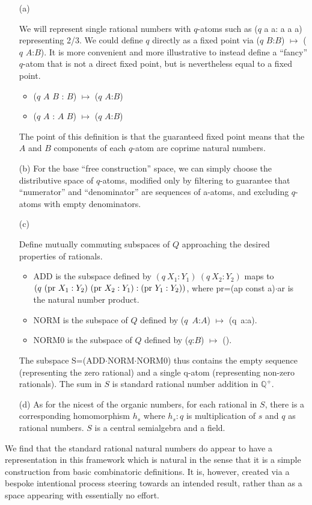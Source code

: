 \documentclass[11pt]{article}
\begin{document}
\begin{itemize} 
\item[(a)] { 
We will represent single rational numbers with $q$-atoms such as ($q$ a a: a a a) representing 2/3.  
We could define $q$ directly as a fixed point via ($q$ $B$:$B$) $\mapsto$ ($q$ $A$:$B$).  
It is more convenient and more illustrative to instead define a ``fancy'' $q$-atom that is not a direct fixed point, but is nevertheless equal to a fixed point. 
\begin{itemize}
\item{($q$ $A$ $B$ : $B$) $\mapsto$ ($q$ $A$:$B$)}
\item{($q$ $A$ : $A$ $B$) $\mapsto$ ($q$ $A$:$B$)} 
\end{itemize}
The point of this definition is that the guaranteed fixed point means that the $A$ and $B$ components of each $q$-atom 
are coprime natural numbers.
 }
 \item[(b)] {For the base ``free construction'' space, we can simply choose the distributive space of $q$-atoms, modified only by 
 filtering to guarantee that ``numerator'' and ``denominator'' are sequences of a-atoms, and excluding $q$-atoms with empty denominators. 
}
 \item[(c)] {Define mutually commuting subspaces of $Q$ approaching the desired properties of rationals. 
\begin{itemize}
\item{ADD is the subspace defined by $(q\ X_1:Y_1)\ (q\ X_2:Y_2)$ maps to 
$(q\ ({\rm pr}\ X_1:Y_2)\ ({\rm pr}\ X_2:Y_1) : ({\rm pr}\ Y_1:Y_2))$, where 
pr=(ap const a)$\cdot$ar is the natural number product.}
\item{NORM is the subspace of $Q$ defined by ($q$\ $A$:$A$) $\mapsto$ (q\ a:a).}
\item{NORM0 is the subspace of $Q$ defined by ($q$:$B$) $\mapsto$ ().}  
\end{itemize}
The subspace S=(ADD$\cdot$NORM$\cdot$NORM0) thus contains the empty sequence (representing the zero rational) and a single q-atom (representing non-zero rationals).  The sum in $S$ is standard rational number addition in $\mathbb Q^+$.

 }
 \item[(d)] { 
 As for the nicest of the organic numbers, for each rational in $S$, there is a corresponding homomorphism $h_s$ where $h_s:q$ is multiplication 
of $s$ and $q$ as rational numbers.  $S$ is a central semialgebra and a field.  
 }
 \end{itemize} 
 We find that the standard rational natural numbers do appear to have a representation in this framework which is natural in the sense that 
 it is a simple construction from basic combinatoric definitions.  It is, however, created via a bespoke intentional process steering towards 
 an intended result, rather than as a space appearing with essentially no effort. 
 
\end{document}
